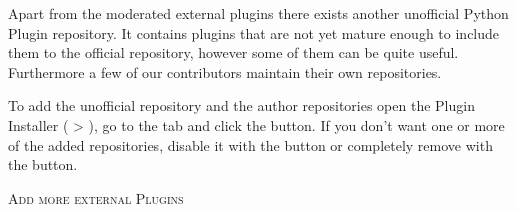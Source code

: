 
Apart from the moderated external plugins there exists another unofficial
Python Plugin repository. It contains plugins that are not yet mature
enough to include them to the official repository, however some of them
can be quite useful. Furthermore a few of our contributors maintain
their own repositories.

To add the unofficial repository and the author repositories open the 
Plugin Installer ( > ),
go to the  tab and click the 
button. If you don't want one or more of the added repositories, disable it with the
 button or completely remove with the  button.

\begin{Tip} \caption{\textsc{Add more external Plugins}}
\end{Tip}

